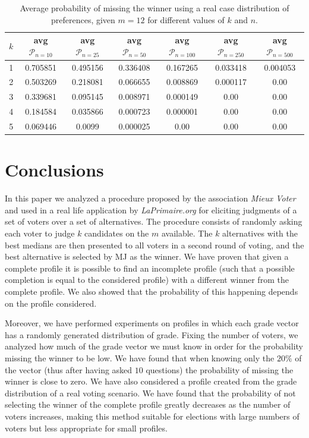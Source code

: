 	
	\begin{table}
		\centering
		\captionsetup{type=table}
		\caption{Average probability of missing the winner using a real case distribution of preferences, given $m=12$ for different values of $k$ and $n$.}
		\label{tab:MJelicitationUAV}
		\begin{tabular}{S[table-figures-integer=1, table-figures-decimal=0]S[table-figures-decimal=2]S[table-figures-decimal=2]S[table-figures-decimal=2]S[table-figures-decimal=2]S[table-figures-decimal=2]S[table-figures-decimal=2]}
			\toprule
			{$k$} & {avg $\mathcal{P}_{n=10}$} & {avg $\mathcal{P}_{n=25}$}& {avg $\mathcal{P}_{n=50}$}& {avg $\mathcal{P}_{n=100}$}& {avg $\mathcal{P}_{n=250}$} & {avg $\mathcal{P}_{n=500}$} \\
				&	0.705851	&	0.495156	&	0.336408	&	0.167265	&	0.033418	&	0.004053	\\
			2	&	0.503269	&	0.218081	&	0.066655	&	0.008869	&	0.000117	&	0.00	\\
			3	&	0.339681	&	0.095145	&	0.008971	&	0.000149	&	0.00	&	0.00	\\
			4	&	0.184584	&	0.035866	&	0.000723	&	0.000001	&	0.00	&	0.00	\\
			5	&	0.069446	&	0.0099	&	0.000025	&	0.00	&	0.00	&	0.00	\\				
			\bottomrule
		\end{tabular}
	\end{table}
	
	\section{Conclusions}
		In this paper we analyzed a procedure proposed by the association \textit{Mieux Voter} and used in a real life application by \textit{LaPrimaire.org} for eliciting judgments of a set of voters over a set of alternatives.
		The procedure consists of randomly asking each voter to judge $k$ candidates on the $m$ available. The $k$ alternatives with the best medians are then presented to all voters in a second round of voting, and the best alternative is selected by \ac{MJ} as the winner.
		We have proven that given a complete profile it is possible to find an incomplete profile (such that a possible completion is equal to the considered profile) with a different winner from the complete profile.
		We also showed that the probability of this happening depends on the profile considered. 
		
		Moreover, we have performed experiments on profiles in which each grade vector has a randomly generated distribution of grade. Fixing the number of voters, we analyzed how much of the grade vector we must know in order for the probability missing the winner to be low. We have found that when knowing only the $20\%$ of the vector (thus after having asked $10$ questions) the probability of missing the winner is close to zero.
		We have also considered a profile created from the grade distribution of a real voting scenario. We have found that the probability of not selecting the winner of the complete profile greatly decreases as the number of voters increases, making this method suitable for elections with large numbers of voters but less appropriate for small profiles.
		
